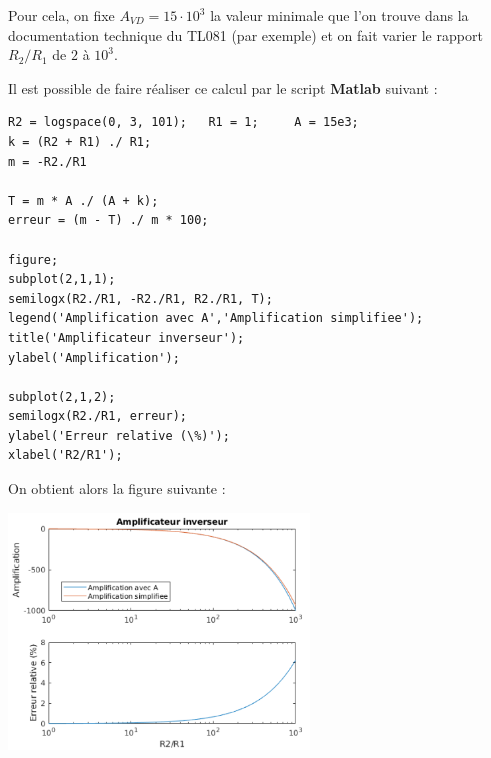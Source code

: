 \documentclass[a4paper,french]{paper}
\begin{document}
Pour cela, on fixe $A_{VD} = 15 \cdot 10^3$ la valeur minimale que l'on trouve dans la documentation technique du TL081 (par exemple) et on fait varier le rapport $R_2 / R_1$ de $2$ à $10^3$.

Il est possible de faire réaliser ce calcul par le script \textbf{Matlab} suivant :

\begin{lstlisting}[style=Matlab-editor]
R2 = logspace(0, 3, 101); 	R1 = 1; 	A = 15e3;
k = (R2 + R1) ./ R1;  	
m = -R2./R1

T = m * A ./ (A + k);		
erreur = (m - T) ./ m * 100;

figure;		
subplot(2,1,1);
semilogx(R2./R1, -R2./R1, R2./R1, T);
legend('Amplification avec A','Amplification simplifiee');
title('Amplificateur inverseur');		
ylabel('Amplification');

subplot(2,1,2);
semilogx(R2./R1, erreur);
ylabel('Erreur relative (\%)');		
xlabel('R2/R1');
\end{lstlisting}

On obtient alors la figure suivante : 

\begin{center}
	\includegraphics[width=8cm]{images/ampliinv_002_cor_a.png}
\end{center}



\end{document}
